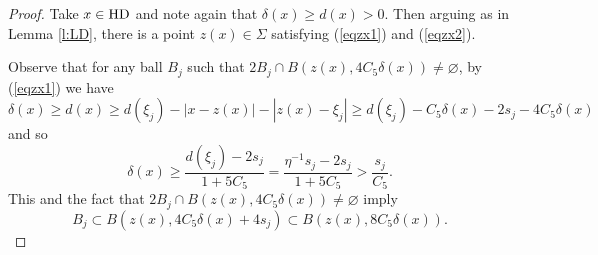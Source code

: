 \documentclass[11pt]{amsart}
\newcommand{\rf}[1]{{(\ref{#1})}}
\newcommand{\HD}{{\mathsf{HD}}}
\theoremstyle{definition}
\theoremstyle{remark}
\def\HD{{\rm HD}}
\numberwithin{equation}{section}
\begin{document}
\begin{proof}
Take $x\in\HD$ and note again that $\delta(x)\geq d(x)>0$. Then arguing as in Lemma \ref{l:LD}, there is a point $z(x)\in\Sigma$
satisfying \rf{eqzx1} and \rf{eqzx2}.

Observe that for any ball $B_j$ such that $2B_{j}\cap B(z(x),4C_5\delta(x))\neq\varnothing$, by
\rf{eqzx1} we have
\[
\delta(x) \geq d(x) \geq d(\xi_{j})-|x-z(x)|-|z(x)-\xi_{j}|\geq d(\xi_{j}) -C_5\delta(x)-2s_{j}-4C_5\delta(x)
\]
and so 
\begin{equation}\label{e:delta>si}
\delta(x)\geq  \frac{d(\xi_{j})-2s_{j}}{1+5C_5}
=\frac{\eta^{-1}s_{j}-2s_{j}}{1+5C_5}
>\frac{s_{j}}{C_5}.
\end{equation}
This and the fact that $2B_{j}\cap B(z(x),4C_5\delta(x))\neq\varnothing$ imply
\begin{equation}\label{e:Bi<C0d}
B_{j}\subset B(z(x),4C_5\delta(x)+4s_{j}) \subset   B(z(x),8C_5\delta(x)).
\end{equation}


\end{proof}
\end{document}
